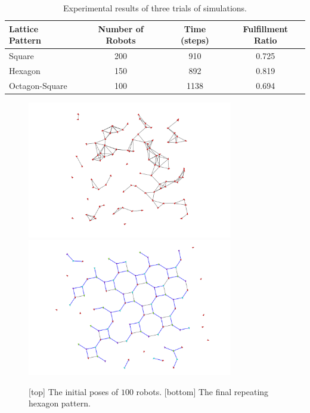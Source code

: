\begin{table}
  \small\centering
  \caption{Experimental results of three trials of simulations.}
    \begin{tabular}{lccc} 
    \toprule 
    \textbf{Lattice Pattern} & \textbf{Number of Robots} & \textbf{Time (steps)} & \textbf{Fulfillment Ratio} \\
    \midrule
    Square & 200 & 910 & 0.725  \\ 
    \midrule
    Hexagon & 150 & 892 & 0.819 \\
    \midrule
    Octagon-Square & 100 & 1138 & 0.694 \\
    \bottomrule     
    \end{tabular}
    \label{tab:mrf1-exp-data}
\end{table}

\begin{figure}
    \centering
   \includegraphics[trim=5cm 0cm 5cm 0cm, clip=true, width=0.8\textwidth]{figs/octsq100_init.png}
   \bigskip
   \includegraphics[trim=5cm 0cm 5cm 0cm, clip=true, width=0.8\textwidth]{figs/octsq100_final.png}
   \caption{[top] The initial poses of $100$ robots. [bottom] The final repeating hexagon pattern.}
   \label{fig:octagonsquare-init-final}
\end{figure}

